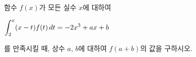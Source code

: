 함수 $f(x)$가 모든 실수 $x$에 대하여 \par\smallskip\noindent\hspace*{1.5em}$\displaystyle\int_{2}^{x}(x-t)f(t)\mkern3mu dt=-2x^3+ax+b$\par\smallskip\noindent 를 만족시킬 때, 상수 $a$, $b$에 대하여 $f(a+b)$의 값을 구하시오.
